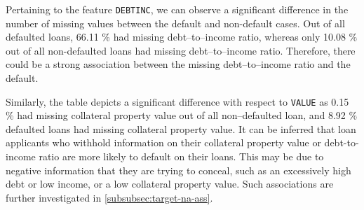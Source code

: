     Pertaining to the feature \texttt{DEBTINC}, we can observe a significant difference in the number of missing values between the default and non-default cases. Out of all defaulted loans, 66.11 \% had missing debt--to--income ratio, whereas only 10.08 \% out of all non-defaulted loans had missing debt--to--income ratio.
    Therefore, there could be a strong association between the missing debt--to--income ratio and the default.

    Similarly, the table depicts a significant difference with respect to \texttt{VALUE} as 0.15 \% had missing collateral property value out of all non--defaulted loan, and 8.92 \% defaulted loans had missing collateral property value.
    It can be inferred that loan applicants who withhold information on their collateral property value or debt-to-income ratio are more likely to default on their loans.
    This may be due to negative information that they are trying to conceal, such as an excessively high debt or low income, or a low collateral property value.
    Such associations are further investigated in \autoref{subsubsec:target-na-ass}.


